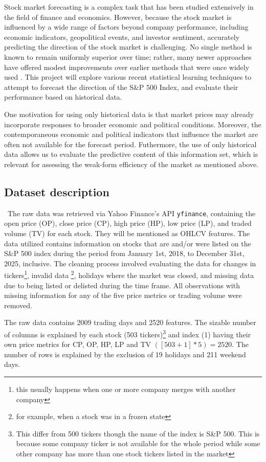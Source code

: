 \documentclass[11pt]{article}
\begin{document}
Stock market forecasting is a complex task that has been studied extensively in the field of finance and economics. However, because the stock market is influenced by a wide range of factors beyond company performance, including economic indicators, geopolitical events, and investor sentiment, accurately predicting the direction of the stock market is challenging. No single method is known to remain uniformly superior over time; rather, many newer approaches have offered modest improvements over earlier methods that were once widely used \cite{KUMBURE_2022}. This project will explore various recent statistical learning techniques to attempt to forecast the direction of the S\&P 500 Index, and evaluate their performance based on historical data.

One motivation for using only historical data is that market prices may already incorporate responses to broader economic and political conditions. Moreover, the contemporaneous economic and political indicators that influence the market are often not available for the forecast period. Futhermore, the use of only historical data allows us to evaluate the predictive content of this information set, which is relevant for assessing the weak-form efficiency of the market as mentioned above.

\subsection{Dataset description}

\quad \ The raw data was retrieved via Yahoo Finance's API \verb|yfinance|, containing the open price (OP), close price (CP), high price (HP), low price (LP), and traded volume (TV) for each stock. They will be mentioned as OHLCV features. The data utilized contains information on stocks that are and/or were listed on the S\&P 500 index during the period from January 1st, 2018, to December 31st, 2025, inclusive. The cleaning process involved evaluating the data for changes in tickers\footnote{this usually happens when one or more company merges with another company}, invalid data \footnote{for example, when a stock was in a frozen state}, holidays where the market was closed, and missing data due to being listed or delisted during the time frame. All observations with missing information for any of the five price metrics or trading volume were removed.

The raw data contains 2009 trading days and 2520 features. The sizable number of columns is explained by each stock (503 tickers)\footnote{This differ from 500 tickers though the name of the index is S\&P 500. This is because some company ticker is not available for the whole period while some other company has more than one stock tickers listed in the market} and index (1) having their own price metrics for CP, OP, HP, LP and TV $([503+1] * 5)=2520$. The number of rows is explained by the exclusion of 19 holidays and 211 weekend days. 
\end{document}
